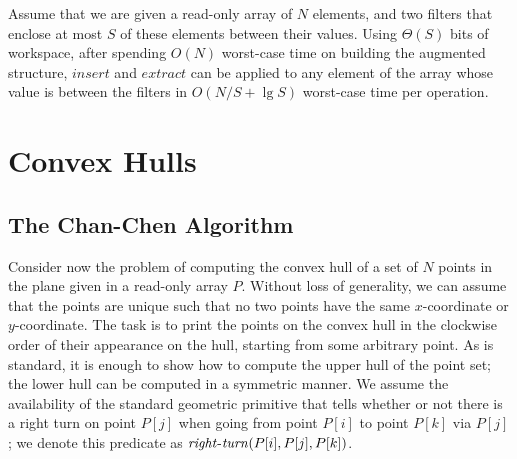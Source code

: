 \documentclass[final,onetabnum,onefignum,onethmnum]{siamltex}
\newcommand{\Insert}{\mbox{$\mathit{insert}$}}
\newcommand{\Extract}{\mbox{$\mathit{extract}$}}
\begin{document}
\begin{lemma}
Assume that we are given a read-only array of $N$ elements, and two
filters that enclose at most $S$ of these elements between their
values.  Using $\Theta(S)$ bits of workspace, after spending $O(N)$
worst-case time on building the augmented structure, \Insert{} and
\Extract{} can be applied to any element of the array whose value is
between the filters in $O(N/S + \lg S)$ worst-case time per operation.
\end{lemma}


\section{Convex Hulls}
\label{ch}

\subsection{The Chan-Chen Algorithm}

Consider now the problem of computing the convex hull of a set
of $N$ points in the plane given in a read-only array $P$. Without loss of generality,
we can assume that the points are unique such that no two
points have the same $x$-coordinate or $y$-coordinate. The task is to
print the points on the convex hull in the clockwise order of their
appearance on the hull, starting from some arbitrary point. As is
standard, it is enough to show how to compute the upper hull of the
point set; the lower hull can be computed in a symmetric manner.
We assume the availability of the standard geometric primitive that
tells whether or not there is a right turn on point $P[j]$ when going from
point $P[i]$ to point $P[k]$ via $P[j]$; we denote this predicate as
$\mathit{right}\mbox{\rm -}\mathit{turn}(P[i], P[j], P[k])$.
\end{document}
